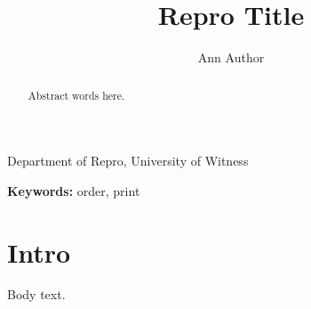 \documentclass{article}
\title{Repro Title}\author{Ann Author}\date{}
\begin{document}
\maketitle
\begin{center}Department of Repro, University of Witness\end{center}
\noindent\textbf{Keywords:} order, print

\begin{abstract}Abstract words here.\end{abstract}
\section{Intro}Body text.
\end{document}
